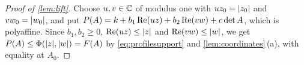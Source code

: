 \begin{proof}[Proof of \cref{lem:lift}]
Choose $u,v\in\mathbb{C}$ of modulus one with $uz_0=\lvert z_0\rvert$ and $vw_0=\lvert w_0\rvert$, and put
$P(A)=k+b_1\operatorname{Re}(uz)+b_2\operatorname{Re}(vw)+c\det A$, which is polyaffine. Since $b_1,b_2\ge0$,
$\operatorname{Re}(uz)\le\lvert z\rvert$ and $\operatorname{Re}(vw)\le\lvert w\rvert$, we get $P(A)\le\Phi(\lvert z\rvert,\lvert w\rvert)=F(A)$ by
\eqref{eq:profilesupport} and \cref{lem:coordinates}\,(a), with equality at $A_0$.
\end{proof}
